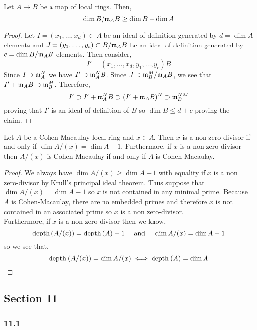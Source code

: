 \documentclass[12pt]{article}
\begin{document}
\begin{lemma}[A]
Let $A \to B$ be a map of local rings. Then,
\[ \dim{B/\mathfrak{m}_A B} \ge \dim{B} - \dim{A} \]
\end{lemma}

\begin{proof}
Let $I = (x_1, \dots, x_d) \subset A$ be an ideal of definition generated by $d = \dim{A}$ elements and $J = (\bar{y}_1, \dots,\bar{y}_c) \subset B/\mathfrak{m}_A B$ be an ideal of definition generated by $c = \dim{B/\mathfrak{m}_A B}$ elements. Then consider, 
\[ I' = (x_1, \dots, x_d, y_1, \dots, y_c) B \] 
Since $I \supset \mathfrak{m}_A^N$ we have $I' \supset \mathfrak{m}_A^N B$. Since $J \supset \mathfrak{m}_B^M / \mathfrak{m}_A B$, we see that $I' + \mathfrak{m}_A B \supset \mathfrak{m}_B^M$. Therefore,
\[ I' \supset I' + \mathfrak{m}_A^N B \supset (I' + \mathfrak{m}_A B)^N \supset \mathfrak{m}_B^{NM} \]
proving that $I'$ is an ideal of definition of $B$ so $\dim{B} \le d + c$ proving the claim.
\end{proof}

\begin{lemma}[B]
Let $A$ be a Cohen-Macaulay local ring and $x \in A$. Then $x$ is a non zero-divisor if and only if $\dim{A/(x)} = \dim{A} - 1$. Furthermore, if $x$ is a non zero-divisor then $A/(x)$ is Cohen-Macaulay if and only if $A$ is Cohen-Macaulay.
\end{lemma}

\begin{proof}
We always have $\dim{A/(x)} \ge \dim{A} - 1$ with equality if $x$ is a non zero-divisor by Krull's principal ideal theorem. Thus suppose that $\dim{A/(x)} = \dim{A} - 1$ so $x$ is not contained in any minimal prime. Because $A$ is Cohen-Macaulay, there are no embedded primes and therefore $x$ is not contained in an associated prime so $x$ is a non zero-divisor.
\bigskip\\
Furthermore, if $x$ is a non zero-divisor then we know,
\[ \mathrm{depth}_{} \left( A/(x) \right) = \mathrm{depth}_{} \left( A \right) - 1 \quad \text{ and } \quad \dim{A/(x)} = \dim{A} - 1 \]
so we see that,
\[ \mathrm{depth}_{} \left( A/(x) \right) = \dim{A/(x)} \iff \mathrm{depth}_{} \left( A \right) = \dim{A} \]
\end{proof}

\subsection{Section 11}


\subsubsection{11.1}
\end{document}

